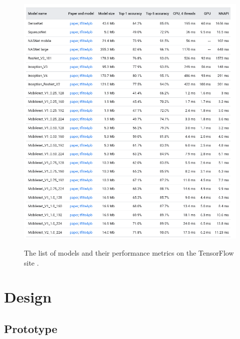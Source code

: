 \documentclass[12pt,a4paper]{report}
\begin{document}
\begin{figure}[h]\
    \centering
    \includegraphics[width=\textwidth]{models.png}
    \caption{The list of models and their performance metrics on the TensorFlow site \citep{TFhostedmodels}.}
    \label{fig:models}
\end{figure}
\clearpage

\section{Design}

\subsection{Prototype}
\end{document}
